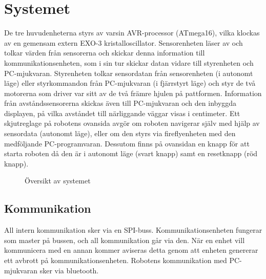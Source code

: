 %

\section{Systemet}

De tre huvudenheterna styrs av varsin AVR-processor (ATmega16), vilka klockas 
av en gemensam extern EXO-3 kristalloscillator. Sensorenheten läser av och 
tolkar värden från sensorerna och skickar denna information till 
kommunikationsenheten, som i sin tur skickar datan vidare till styrenheten 
och PC-mjukvaran. Styrenheten tolkar sensordatan från 
sensorenheten (i autonomt läge) eller styrkommandon från PC-mjukvaran 
(i fjärrstyrt läge) och styr de två motorerna som driver var sitt av de två 
främre hjulen på pattformen. Information från avståndssensorerna skickas även
till PC-mjukvaran och den inbyggda displayen, på vilka avståndet till 
närliggande väggar visas i centimeter.  Ett skjutreglage på robotens ovansida 
avgör om roboten navigerar själv med hjälp av sensordata (autonomt läge), 
eller om den styrs via fireflyenheten med den medföljande PC-programvaran. 
Dessutom finns på ovansidan en knapp för att starta roboten då den är i autonomt läge 
(svart knapp) samt en resetknapp (röd knapp).

\begin{figure}[H]
 \centering
  \caption{Översikt av systemet}
  \label{fig:system}
\end{figure}


\subsection{Kommunikation}
All intern kommunikation sker via en SPI-buss. Kommunikationsenheten fungerar 
som master på bussen, och all kommunikation går via den. När en enhet vill 
kommunicera med en annan kommer aviseras detta genom att enheten genererar 
ett avbrott på kommunikationsenheten.  Robotens kommunikation med PC-
mjukvaran sker via bluetooth.
